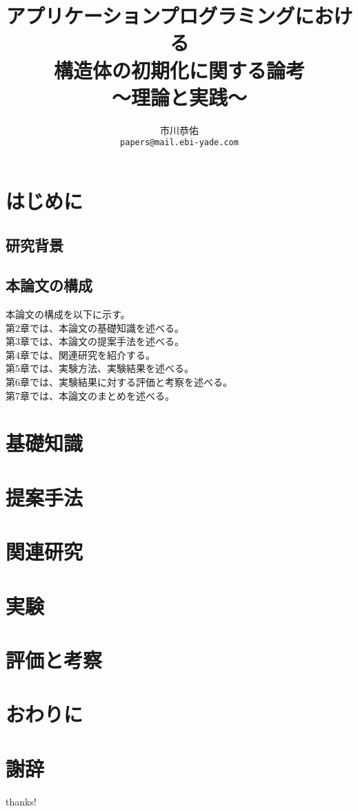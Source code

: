 \documentclass[a4paper,12pt]{jsreport}
\title{
\LARGE{アプリケーションプログラミングにおける\\構造体の初期化に関する論考}\\
\Large{〜理論と実践〜}
}
\author{市川恭佑\\\texttt{papers@mail.ebi-yade.com}}
\date{}
\begin{document}
\maketitle
{}
\tableofcontents
\newpage
\listoffigures
\listoftables
\newpage
{}
\newpage

\chapter{はじめに}
\section{研究背景}
\section{本論文の構成}
本論文の構成を以下に示す。\\
第2章では、本論文の基礎知識を述べる。\\
第3章では、本論文の提案手法を述べる。\\
第4章では、関連研究を紹介する。\\
第5章では、実験方法、実験結果を述べる。\\
第6章では、実験結果に対する評価と考察を述べる。\\
第7章では、本論文のまとめを述べる。

\chapter{基礎知識}
\chapter{提案手法}
\chapter{関連研究}
\chapter{実験}
\chapter{評価と考察}
\chapter{おわりに}
\chapter*{謝辞}
thanks!

\newpage
\renewcommand{\bibname}{参考文献}
\begin{thebibliography}{2}
\end{thebibliography}

\newpage
\end{document}

